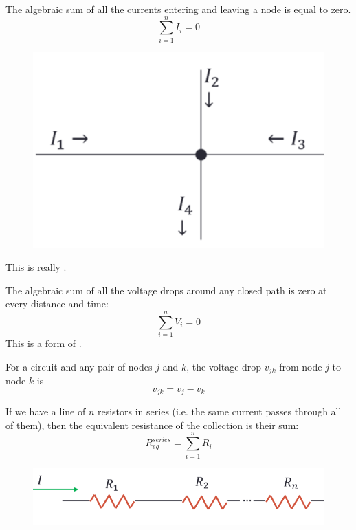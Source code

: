 \documentclass[12pt, a4paper, oneside, openright, titlepage]{book}
\begin{document}
\begin{thm}
    The algebraic sum of all the currents entering and leaving a node is equal to zero. \begin{equation*}
        \sum_{i=1}^nI_i = 0
    \end{equation*}
    \begin{figure}[H]
        \centering
        \includegraphics[scale = 0.8]{Images/TH2.PNG}
    \end{figure}
    This is really .
\end{thm}

\begin{thm}
    The algebraic sum of all the voltage drops around any closed path is zero at every distance and time: \begin{equation*}
        \sum_{i=1}^nV_i = 0
    \end{equation*}
    This is a form of .
\end{thm}

For a circuit and any pair of nodes $j$ and $k$, the voltage drop $v_{jk}$ from node $j$ to node $k$ is $$v_{jk} = v_j - v_k$$


\begin{thm}
    If we have a line of $n$ resistors in series (i.e. the same current passes through all of them), then the equivalent resistance of the collection is their sum: $$R_{eq}^{series} = \sum_{i=1}^nR_i$$
    \begin{figure}[H]
        \centering
        \includegraphics[scale = 0.8]{Images/TH3.PNG}
    \end{figure}
\end{thm}
\end{document}
